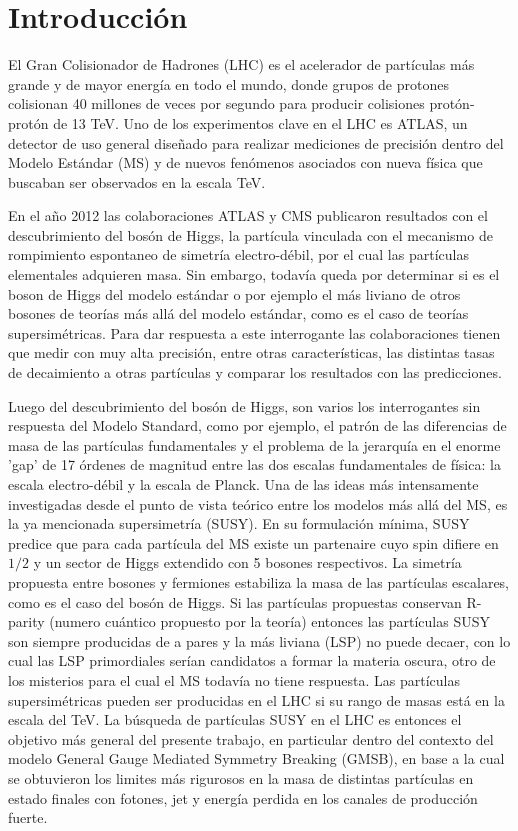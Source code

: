 \chapter*{Introducción}

El Gran Colisionador de Hadrones (LHC) es el acelerador de partículas más grande y de mayor energía en todo el mundo, donde grupos de protones colisionan 40 millones de veces por segundo para producir colisiones protón-protón de 13 TeV. Uno de los experimentos clave en el LHC es ATLAS, un detector de uso general diseñado para realizar mediciones de precisión dentro del Modelo Estándar (MS) y de nuevos fenómenos asociados con nueva física que buscaban ser observados en la escala TeV. 

En el año 2012 las colaboraciones ATLAS y CMS publicaron resultados con el descubrimiento del bosón de Higgs, la partícula vinculada con el mecanismo de rompimiento espontaneo de simetría electro-débil, por el cual las partículas elementales adquieren masa. Sin embargo, todavía queda por determinar si es el boson de Higgs del modelo estándar o por ejemplo el más liviano de otros bosones de teorías más allá del modelo estándar, como es el caso de teorías supersimétricas. Para dar respuesta a este interrogante las colaboraciones tienen que medir con muy alta precisión, entre otras características, las distintas tasas de decaimiento a otras partículas y comparar los resultados con las predicciones.

Luego del descubrimiento del bosón de Higgs, son varios los interrogantes sin respuesta del Modelo Standard, como por ejemplo, el patrón de las diferencias de masa de las partículas fundamentales y el problema de la jerarquía en el enorme 'gap' de 17 órdenes de magnitud entre las dos escalas fundamentales de física: la escala electro-débil y la escala de Planck. Una de las ideas más intensamente investigadas desde el punto de vista teórico entre los modelos más allá del MS, es la ya mencionada supersimetría (SUSY). En su formulación mínima, SUSY predice que para cada partícula del MS existe un partenaire cuyo spin difiere en $1/2$ y un sector de Higgs extendido con 5 bosones respectivos. La simetría propuesta entre bosones y fermiones estabiliza la masa de las partículas escalares, como es el caso del bosón de Higgs. Si las partículas propuestas conservan R-parity (numero cuántico propuesto por la teoría) entonces las partículas SUSY son siempre producidas de a pares y la más liviana (LSP) no puede decaer, con lo cual las LSP primordiales serían candidatos a formar la materia oscura, otro de los misterios para el cual el MS todavía no tiene respuesta. Las partículas supersimétricas pueden ser producidas en el LHC si su rango de masas está en la escala del TeV. La búsqueda de partículas SUSY en el LHC es entonces el objetivo más general del presente trabajo, en particular dentro del contexto del modelo General Gauge Mediated Symmetry Breaking (GMSB), en base a la cual se obtuvieron los limites más rigurosos en la masa de distintas partículas en estado finales con fotones, jet y energía perdida en los canales de producción fuerte.

